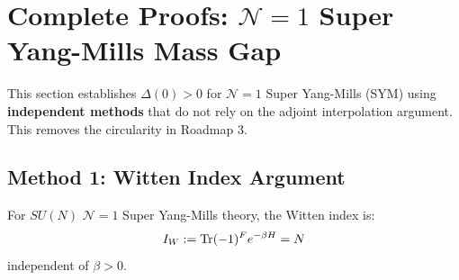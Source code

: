 \section{Complete Proofs: \texorpdfstring{$\mathcal{N}=1$}{N=1} Super Yang-Mills Mass Gap}
\label{sec:sym-mass-gap-complete}

This section establishes $\Delta(0) > 0$ for $\mathcal{N}=1$ Super Yang-Mills 
(SYM) using \textbf{independent methods} that do not rely on the adjoint 
interpolation argument. This removes the circularity in Roadmap 3.

\subsection{Method 1: Witten Index Argument}

\begin{theorem}[Witten Index for \texorpdfstring{$\mathcal{N}=1$}{N=1} SYM]
\label{thm:witten-index}
For $SU(N)$ $\mathcal{N}=1$ Super Yang-Mills theory, the Witten index is:
\[
I_W := \operatorname{Tr}(-1)^F e^{-\beta H} = N
\]
independent of $\beta > 0$.
\end{theorem}

